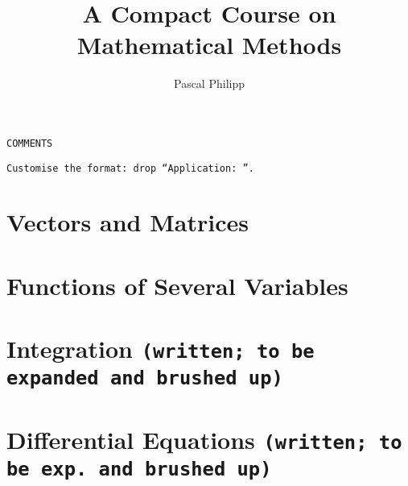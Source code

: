 \documentclass[12pt,a4paper]{report}
\title{A Compact Course on Mathematical Methods}
\author{Pascal Philipp}
\theoremstyle{definition}
\begin{document}
\maketitle

\noindent
\texttt{COMMENTS}
\thispagestyle{empty}
\newpage
\restoregeometry

\tableofcontents
\thispagestyle{empty}
\newpage
\listoftheorems[ignoreall,show={application}]

\bigskip
\noindent
\texttt{Customise the format: drop ``Application: ''.}
\thispagestyle{empty}
\restoregeometry


\chapter{Vectors and Matrices}
\label{ch:vm}


\chapter{Functions of Several Variables}
\label{ch:fsv}


\chapter{Integration \texttt{(written; to be expanded and brushed up)}}
\label{ch:i}


\chapter{Differential Equations \texttt{(written; to be exp.~and brushed up)}}
\label{ch:de}


\printendnotes
\end{document}
